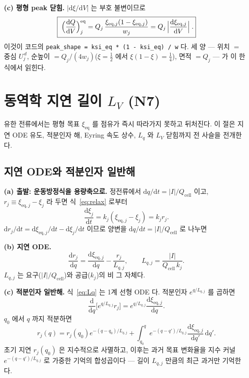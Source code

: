 \documentclass[11pt,a4paper]{article}
\newcommand{\dd}{\mathrm{d}}
\newcommand{\eq}{\mathrm{eq}}
\newcommand{\cell}{\mathrm{cell}}
\newcommand{\code}[1]{\texttt{#1}}
\begin{document}
\textbf{(c) 평형 peak 닫힘.} $|\dd\xi/\dd V|$ 는 부호 불변이므로
\begin{equation}
\boxed{\;\Bigl(\frac{\dd Q}{\dd V}\Bigr)^\eq_j
=Q_j\,\frac{\xi_{\eq,j}(1-\xi_{\eq,j})}{w_j}
=Q_j\,\Bigl|\frac{\dd\xi_{\eq,j}}{\dd V}\Bigr|\;.}
\label{eq:eqpeak}
\end{equation}
이것이 코드의 \code{peak\_shape = ksi\_eq * (1 - ksi\_eq) / w} 다.
세 양 — 위치 $=$ 중심 $U_j^{\,d}$, 순높이 $=Q_j/(4w_j)$($\xi=\tfrac12$ 에서 $\xi(1-\xi)=\tfrac14$),
면적 $=Q_j$ — 가 이 한 식에서 읽힌다.

\section{동역학 지연 길이 $L_V$ (N7)}\label{sec:lag}
유한 전류에서는 평형 목표 $\xi_\eq$ 를 점유가 즉시 따라가지 못하고 뒤처진다. 이 절은 지연 ODE 유도,
적분인자 해, Eyring 속도 상수, $L_q$ 와 $L_V$ 닫힘까지 전 사슬을 전개한다.

\subsection{지연 ODE와 적분인자 일반해}

\textbf{(a) 출발: 운동방정식을 용량축으로.} 정전류에서 $\dd q/\dd t = |I|/Q_\cell$ 이고,
$r_j \equiv \xi_{\eq,j}-\xi_j$ 라 두면 식~\eqref{eq:relax} 로부터
\begin{equation}
\frac{\dd\xi_j}{\dd t} = k_j(\xi_{\eq,j}-\xi_j) = k_j r_j.
\label{eq:dxidt}
\end{equation}
$\dd r_j/\dd t = \dd\xi_{\eq,j}/\dd t - \dd\xi_j/\dd t$ 이므로 양변을 $\dd q/\dd t = |I|/Q_\cell$ 로 나누면

\textbf{(b) 지연 ODE.}
\begin{equation}
\frac{\dd r_j}{\dd q} = \frac{\dd\xi_{\eq,j}}{\dd q} - \frac{r_j}{L_{q,j}},
\qquad L_{q,j} = \frac{|I|}{Q_\cell\,k_j}.
\label{eq:Lq}
\end{equation}
$L_{q,j}$ 는 요구($|I|/Q_\cell$)와 공급($k_j$)의 비 그 자체다.

\textbf{(c) 적분인자 일반해.} 식~\eqref{eq:Lq} 는 1계 선형 ODE 다. 적분인자 $e^{q/L_{q,j}}$ 를 곱하면
\begin{equation}
\frac{\dd}{\dd q}\bigl[e^{q/L_{q,j}}r_j\bigr] = e^{q/L_{q,j}}\frac{\dd\xi_{\eq,j}}{\dd q}.
\label{eq:ifactor}
\end{equation}
$q_0$ 에서 $q$ 까지 적분하면
\begin{equation}
r_j(q) = r_j(q_0)e^{-(q-q_0)/L_{q,j}}
+ \int_{q_0}^q e^{-(q-q')/L_{q,j}}\frac{\dd\xi_{\eq,j}}{\dd q'}\,\dd q'.
\label{eq:gensol}
\end{equation}
초기 지연 $r_j(q_0)$ 은 지수적으로 사멸하고, 이후는 과거 목표 변화율을 지수 커널
$e^{-(q-q')/L_{q,j}}$ 로 가중한 기억의 합성곱이다 — 길이 $L_{q,j}$ 만큼의 최근 과거만 기억한다.
\end{document}
